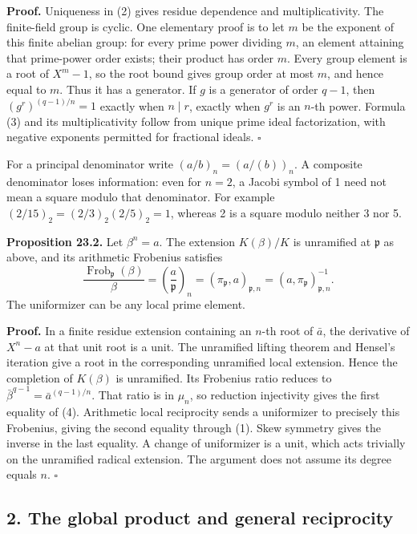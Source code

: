 \documentclass[11pt,a4paper]{article}
\begin{document}
\textbf{Proof.} Uniqueness in (2) gives residue dependence and
multiplicativity. The finite-field group is cyclic. One elementary proof
is to let \(m\) be the exponent of this finite abelian group: for every
prime power dividing \(m\), an element attaining that prime-power order
exists; their product has order \(m\). Every group element is a root of
\(X^m-1\), so the root bound gives group order at most \(m\), and hence
equal to \(m\). Thus it has a generator. If \(g\) is a generator of
order \(q-1\), then \((g^r)^{(q-1)/n}=1\) exactly when \(n\mid r\),
exactly when \(g^r\) is an \(n\)-th power. Formula (3) and its
multiplicativity follow from unique prime ideal factorization, with
negative exponents permitted for fractional ideals. \(\square\)

For a principal denominator write \((a/b)_n=(a/(b))_n\). A composite
denominator loses information: even for \(n=2\), a Jacobi symbol of 1
need not mean a square modulo that denominator. For example
\((2/15)_2=(2/3)_2(2/5)_2=1\), whereas 2 is a square modulo neither 3
nor 5.

\textbf{Proposition 23.2.} Let \(\beta^n=a\). The extension
\(K(\beta)/K\) is unramified at \(\mathfrak p\) as above, and its
arithmetic Frobenius satisfies \[
\frac{\operatorname{Frob}_{\mathfrak p}(\beta)}\beta
=\left(\frac a{\mathfrak p}\right)_n
=(\pi_{\mathfrak p},a)_{\mathfrak p,n}
=(a,\pi_{\mathfrak p})_{\mathfrak p,n}^{-1}.
\tag{4}
\] The uniformizer can be any local prime element.

\textbf{Proof.} In a finite residue extension containing an \(n\)-th
root of \(\bar a\), the derivative of \(X^n-a\) at that unit root is a
unit. The unramified lifting theorem and Hensel's iteration give a root
in the corresponding unramified local extension. Hence the completion of
\(K(\beta)\) is unramified. Its Frobenius ratio reduces to
\(\bar\beta^{q-1}=\bar a^{(q-1)/n}\). That ratio is in \(\mu_n\), so
reduction injectivity gives the first equality of (4). Arithmetic local
reciprocity sends a uniformizer to precisely this Frobenius, giving the
second equality through (1). Skew symmetry gives the inverse in the last
equality. A change of uniformizer is a unit, which acts trivially on the
unramified radical extension. The argument does not assume its degree
equals \(n\). \(\square\)

\subsection{2. The global product and general
reciprocity}\label{the-global-product-and-general-reciprocity}
\end{document}
